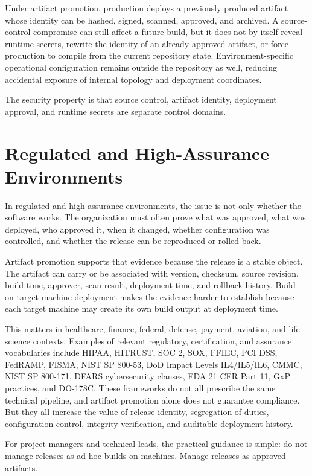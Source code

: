 \documentclass[11pt]{article}
\begin{document}
Under artifact promotion, production deploys a previously produced artifact whose identity can be hashed, signed, scanned, approved, and archived. A source-control compromise can still affect a future build, but it does not by itself reveal runtime secrets, rewrite the identity of an already approved artifact, or force production to compile from the current repository state. Environment-specific operational configuration remains outside the repository as well, reducing accidental exposure of internal topology and deployment coordinates.

The security property is that source control, artifact identity, deployment approval, and runtime secrets are separate control domains.

\section{Regulated and High-Assurance Environments}

In regulated and high-assurance environments, the issue is not only whether the software works. The organization must often prove what was approved, what was deployed, who approved it, when it changed, whether configuration was controlled, and whether the release can be reproduced or rolled back.

Artifact promotion supports that evidence because the release is a stable object. The artifact can carry or be associated with version, checksum, source revision, build time, approver, scan result, deployment time, and rollback history. Build-on-target-machine deployment makes the evidence harder to establish because each target machine may create its own build output at deployment time.

This matters in healthcare, finance, federal, defense, payment, aviation, and life-science contexts. Examples of relevant regulatory, certification, and assurance vocabularies include HIPAA, HITRUST, SOC 2, SOX, FFIEC, PCI DSS, FedRAMP, FISMA, NIST SP 800-53, DoD Impact Levels IL4/IL5/IL6, CMMC, NIST SP 800-171, DFARS cybersecurity clauses, FDA 21 CFR Part 11, GxP practices, and DO-178C. These frameworks do not all prescribe the same technical pipeline, and artifact promotion alone does not guarantee compliance. But they all increase the value of release identity, segregation of duties, configuration control, integrity verification, and auditable deployment history.

For project managers and technical leads, the practical guidance is simple: do not manage releases as ad-hoc builds on machines. Manage releases as approved artifacts.
\end{document}
